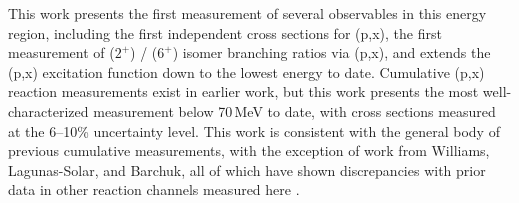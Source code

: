 This work presents the first measurement of several observables in this energy region, including the first independent cross sections for      (p,x),   the first measurement of  ($2^+$) /   ($6^+$)   isomer branching ratios via (p,x),  and extends the (p,x) excitation function down to the lowest energy to date. 
Cumulative  (p,x) reaction measurements exist in earlier work, but  this work presents the most well-characterized measurement  below 70\,MeV to date, with cross sections measured  at the 6--10\% uncertainty level.
This work is consistent with the general body of previous cumulative  measurements, with the exception of work from Williams, Lagunas-Solar, and Barchuk, all of which have shown discrepancies with prior data in other reaction channels measured here \cite{barchuk1987excitation,Lagunas-Solar1979a,PhysRev.162.1055}.



